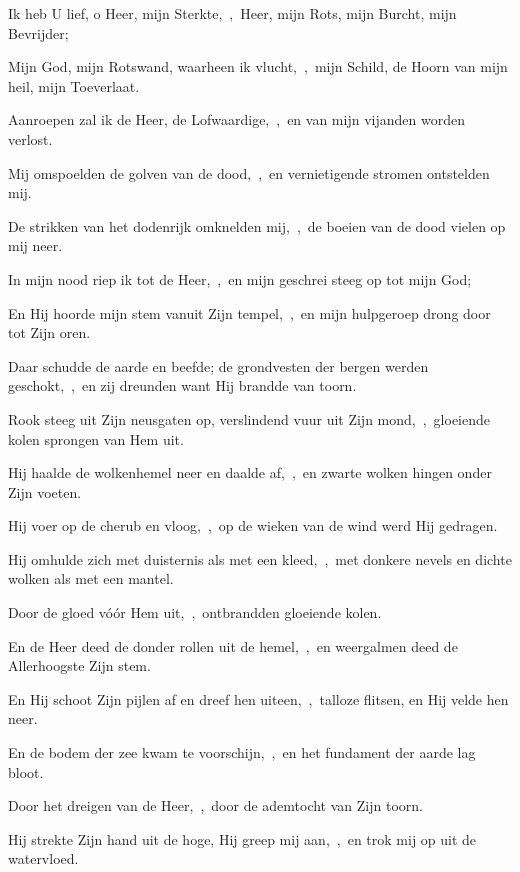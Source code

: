 \documentclass[12pt,twoside,a5paper]{article}
\begin{document}
\begin{halfparskip}
   Ik heb U lief, o Heer, mijn Sterkte,~\sep\ Heer, mijn Rots, mijn Burcht, mijn Bevrijder;


  Mijn God, mijn Rotswand, waarheen ik vlucht,~\sep\ mijn Schild, de Hoorn van mijn heil, mijn Toeverlaat.

  Aanroepen zal ik de Heer, de Lofwaardige,~\sep\ en van mijn vijanden worden verlost.

  Mij omspoelden de golven van de dood,~\sep\ en vernietigende stromen ontstelden mij.

  De strikken van het dodenrijk omknelden mij,~\sep\ de boeien van de dood vielen op mij neer.

  In mijn nood riep ik tot de Heer,~\sep\ en mijn geschrei steeg op tot mijn God;

  En Hij hoorde mijn stem vanuit Zijn tempel,~\sep\ en mijn hulpgeroep drong door tot Zijn oren.

  Daar schudde de aarde en beefde; de grondvesten der bergen werden geschokt,~\sep\ en zij dreunden want Hij brandde van toorn.

  Rook steeg uit Zijn neusgaten op, verslindend vuur uit Zijn mond,~\sep\ gloeiende kolen sprongen van Hem uit.

  Hij haalde de wolkenhemel neer en daalde af,~\sep\ en zwarte wolken hingen onder Zijn voeten.

  Hij voer op de cherub en vloog,~\sep\ op de wieken van de wind werd Hij gedragen.

  Hij omhulde zich met duisternis als met een kleed,~\sep\ met donkere nevels en dichte wolken als met een mantel.

  Door de gloed vóór Hem uit,~\sep\ ontbrandden gloeiende kolen.

  En de Heer deed de donder rollen uit de hemel,~\sep\ en weergalmen deed de Allerhoogste Zijn stem.

  En Hij schoot Zijn pijlen af en dreef hen uiteen,~\sep\ talloze flitsen, en Hij velde hen neer.

  En de bodem der zee kwam te voorschijn,~\sep\ en het fundament der aarde lag bloot.

  Door het dreigen van de Heer,~\sep\ door de ademtocht van Zijn toorn.

  Hij strekte Zijn hand uit de hoge, Hij greep mij aan,~\sep\ en trok mij op uit de watervloed.


\end{halfparskip}
\end{document}

